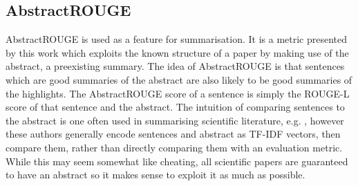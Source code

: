\documentclass[11pt,a4paper]{article}
\begin{document}
\subsection{AbstractROUGE}
\label{sec:abs_rouge}
AbstractROUGE is used as a feature for summarisation. It is a metric presented by this work which exploits the known structure of a paper by making use of the abstract, a preexisting summary. %
The idea of AbstractROUGE is that sentences which are good summaries of the abstract are also likely to be good summaries of the highlights. The AbstractROUGE score of a sentence is simply the ROUGE-L score of that sentence and the abstract. The intuition of comparing sentences to the abstract is one often used in summarising scientific literature, e.g. \cite{papers_citationSaggion2016, kupiec1995trainable}, however these authors generally encode sentences and abstract as TF-IDF vectors, then compare them, rather than directly comparing them with an evaluation metric. While this may seem somewhat like cheating, all scientific papers are guaranteed to have an abstract so it makes sense to exploit it as much as possible. %

\end{document}
